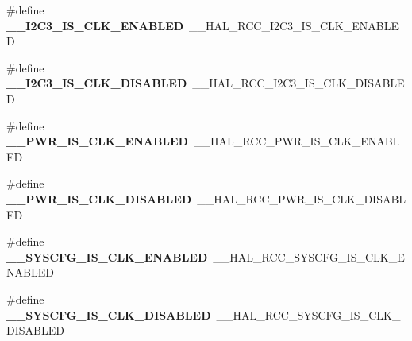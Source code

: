 \begin{DoxyCompactItemize}
\item 
\#define {\bfseries \+\_\+\+\_\+\+I2\+C3\+\_\+\+I\+S\+\_\+\+C\+L\+K\+\_\+\+E\+N\+A\+B\+L\+ED}~\+\_\+\+\_\+\+H\+A\+L\+\_\+\+R\+C\+C\+\_\+\+I2\+C3\+\_\+\+I\+S\+\_\+\+C\+L\+K\+\_\+\+E\+N\+A\+B\+L\+ED\hypertarget{group___h_a_l___r_c_c___aliased_ga02be11fc2d70c7132b634b27595cf577}{}\label{group___h_a_l___r_c_c___aliased_ga02be11fc2d70c7132b634b27595cf577}

\item 
\#define {\bfseries \+\_\+\+\_\+\+I2\+C3\+\_\+\+I\+S\+\_\+\+C\+L\+K\+\_\+\+D\+I\+S\+A\+B\+L\+ED}~\+\_\+\+\_\+\+H\+A\+L\+\_\+\+R\+C\+C\+\_\+\+I2\+C3\+\_\+\+I\+S\+\_\+\+C\+L\+K\+\_\+\+D\+I\+S\+A\+B\+L\+ED\hypertarget{group___h_a_l___r_c_c___aliased_gad11394fc5ca1e4456726571e5f35db88}{}\label{group___h_a_l___r_c_c___aliased_gad11394fc5ca1e4456726571e5f35db88}

\item 
\#define {\bfseries \+\_\+\+\_\+\+P\+W\+R\+\_\+\+I\+S\+\_\+\+C\+L\+K\+\_\+\+E\+N\+A\+B\+L\+ED}~\+\_\+\+\_\+\+H\+A\+L\+\_\+\+R\+C\+C\+\_\+\+P\+W\+R\+\_\+\+I\+S\+\_\+\+C\+L\+K\+\_\+\+E\+N\+A\+B\+L\+ED\hypertarget{group___h_a_l___r_c_c___aliased_ga25e09e85ad3b2897d98591413f859a92}{}\label{group___h_a_l___r_c_c___aliased_ga25e09e85ad3b2897d98591413f859a92}

\item 
\#define {\bfseries \+\_\+\+\_\+\+P\+W\+R\+\_\+\+I\+S\+\_\+\+C\+L\+K\+\_\+\+D\+I\+S\+A\+B\+L\+ED}~\+\_\+\+\_\+\+H\+A\+L\+\_\+\+R\+C\+C\+\_\+\+P\+W\+R\+\_\+\+I\+S\+\_\+\+C\+L\+K\+\_\+\+D\+I\+S\+A\+B\+L\+ED\hypertarget{group___h_a_l___r_c_c___aliased_gaa01b51b10e9f5ff9335ea6108c09fa0a}{}\label{group___h_a_l___r_c_c___aliased_gaa01b51b10e9f5ff9335ea6108c09fa0a}

\item 
\#define {\bfseries \+\_\+\+\_\+\+S\+Y\+S\+C\+F\+G\+\_\+\+I\+S\+\_\+\+C\+L\+K\+\_\+\+E\+N\+A\+B\+L\+ED}~\+\_\+\+\_\+\+H\+A\+L\+\_\+\+R\+C\+C\+\_\+\+S\+Y\+S\+C\+F\+G\+\_\+\+I\+S\+\_\+\+C\+L\+K\+\_\+\+E\+N\+A\+B\+L\+ED\hypertarget{group___h_a_l___r_c_c___aliased_ga16af3115d73d7dff282a9ccb86b3ea63}{}\label{group___h_a_l___r_c_c___aliased_ga16af3115d73d7dff282a9ccb86b3ea63}

\item 
\#define {\bfseries \+\_\+\+\_\+\+S\+Y\+S\+C\+F\+G\+\_\+\+I\+S\+\_\+\+C\+L\+K\+\_\+\+D\+I\+S\+A\+B\+L\+ED}~\+\_\+\+\_\+\+H\+A\+L\+\_\+\+R\+C\+C\+\_\+\+S\+Y\+S\+C\+F\+G\+\_\+\+I\+S\+\_\+\+C\+L\+K\+\_\+\+D\+I\+S\+A\+B\+L\+ED\hypertarget{group___h_a_l___r_c_c___aliased_gadde476f7114c1e6239bda846adbb9c3c}{}\label{group___h_a_l___r_c_c___aliased_gadde476f7114c1e6239bda846adbb9c3c}


\end{DoxyCompactItemize}
